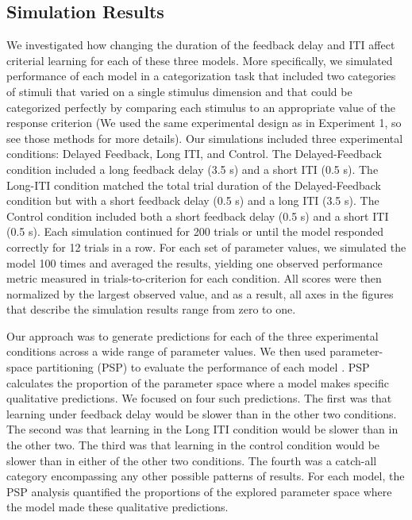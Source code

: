 \documentclass[doc, floatsintext]{apa7}
\begin{document}
\subsection{Simulation Results}
We investigated how changing the duration of the feedback
delay and ITI affect criterial learning for each of these
three models. More specifically, we simulated performance of
each model in a categorization task that included two
categories of stimuli that varied on a single stimulus
dimension and that could be categorized perfectly by
comparing each stimulus to an appropriate value of the
response criterion (We used the same experimental design as
in Experiment 1, so see those methods for more details). Our
simulations included three experimental conditions: Delayed
Feedback, Long ITI, and Control. The Delayed-Feedback
condition included a long feedback delay (3.5 s) and a short
ITI (0.5 s). The Long-ITI condition matched the total trial
duration of the Delayed-Feedback condition but with a short
feedback delay (0.5 s) and a long ITI (3.5 s). The Control
condition included both a short feedback delay (0.5 s) and a
short ITI (0.5 s). Each simulation continued for 200 trials
or until the model responded correctly for 12 trials in a
row. For each set of parameter values, we simulated the
model 100 times and averaged the results, yielding one
observed performance metric measured in trials-to-criterion
for each condition. All scores were then normalized by the
largest observed value, and as a result, all axes in the
figures that describe the simulation results range from zero
to one.

Our approach was to generate predictions for each of the
three experimental conditions across a wide range of
parameter values. We then used parameter-space partitioning
(PSP) to evaluate the performance of each model
\parencite[PSP;][]{pitt2006global}. PSP calculates the
proportion of the parameter space where a model makes
specific qualitative predictions. We focused on four such
predictions. The first was that learning under feedback
delay would be slower than in the other two conditions. The
second was that learning in the Long ITI condition would be
slower than in the other two. The third was that learning in
the control condition would be slower than in either of the
other two conditions. The fourth was a catch-all category
encompassing any other possible patterns of results. For
each model, the PSP analysis quantified the proportions of
the explored parameter space where the model made these
qualitative predictions.
\end{document}
